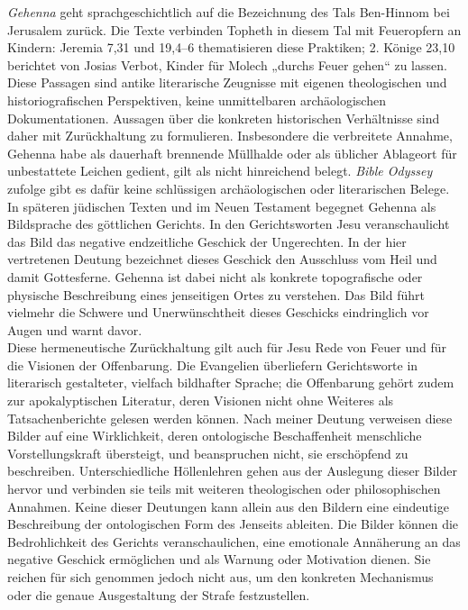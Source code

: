 \emph{Gehenna} geht sprachgeschichtlich auf die Bezeichnung des Tals Ben-Hinnom bei Jerusalem zurück. Die Texte verbinden Topheth in diesem Tal mit Feueropfern an Kindern: Jeremia 7,31 und 19,4--6 thematisieren diese Praktiken; 2. Könige 23,10 berichtet von Josias Verbot, Kinder für Molech „durchs Feuer gehen“ zu lassen. Diese Passagen sind antike literarische Zeugnisse mit eigenen theologischen und historiografischen Perspektiven, keine unmittelbaren archäologischen Dokumentationen. Aussagen über die konkreten historischen Verhältnisse sind daher mit Zurückhaltung zu formulieren. Insbesondere die verbreitete Annahme, Gehenna habe als dauerhaft brennende Müllhalde oder als üblicher Ablageort für unbestattete Leichen gedient, gilt als nicht hinreichend belegt. \emph{Bible Odyssey} zufolge gibt es dafür keine schlüssigen archäologischen oder literarischen Belege.
\\

In späteren jüdischen Texten und im Neuen Testament begegnet Gehenna als Bildsprache des göttlichen Gerichts. In den Gerichtsworten Jesu veranschaulicht das Bild das negative endzeitliche Geschick der Ungerechten. In der hier vertretenen Deutung bezeichnet dieses Geschick den Ausschluss vom Heil und damit Gottesferne. Gehenna ist dabei nicht als konkrete topografische oder physische Beschreibung eines jenseitigen Ortes zu verstehen. Das Bild führt vielmehr die Schwere und Unerwünschtheit dieses Geschicks eindringlich vor Augen und warnt davor.
\\

Diese hermeneutische Zurückhaltung gilt auch für Jesu Rede von Feuer und für die Visionen der Offenbarung. Die Evangelien überliefern Gerichtsworte in literarisch gestalteter, vielfach bildhafter Sprache; die Offenbarung gehört zudem zur apokalyptischen Literatur, deren Visionen nicht ohne Weiteres als Tatsachenberichte gelesen werden können. Nach meiner Deutung verweisen diese Bilder auf eine Wirklichkeit, deren ontologische Beschaffenheit menschliche Vorstellungskraft übersteigt, und beanspruchen nicht, sie erschöpfend zu beschreiben. Unterschiedliche Höllenlehren gehen aus der Auslegung dieser Bilder hervor und verbinden sie teils mit weiteren theologischen oder philosophischen Annahmen. Keine dieser Deutungen kann allein aus den Bildern eine eindeutige Beschreibung der ontologischen Form des Jenseits ableiten. Die Bilder können die Bedrohlichkeit des Gerichts veranschaulichen, eine emotionale Annäherung an das negative Geschick ermöglichen und als Warnung oder Motivation dienen. Sie reichen für sich genommen jedoch nicht aus, um den konkreten Mechanismus oder die genaue Ausgestaltung der Strafe festzustellen.

